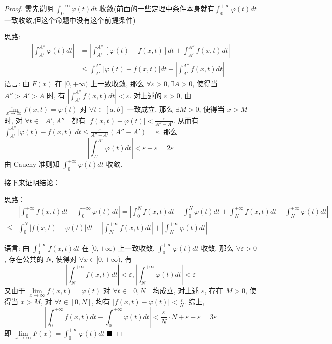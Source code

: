 \documentclass[lang=cn,newtx,10pt,scheme=chinese]{elegantbook}
\begin{document}
\begin{proof}
需先说明 $\int_{0}^{+\infty} \varphi(t) dt$ 收敛(前面的一些定理中条件本身就有$\int_{0}^{+\infty}\varphi(t) dt$一致收敛,但这个命题中没有这个前提条件)

思路:
\begin{align*}
|\int_{A'}^{A''} \varphi(t) dt| &= \left|\int_{A'}^{A''} [\varphi(t) - f(x,t)] dt + \int_{A'}^{A''} f(x,t) dt\right| \\
&\le \int_{A'}^{A''} |\varphi(t) - f(x,t)| dt + \left|\int_{A'}^{A''} f(x,t) dt\right|
\end{align*}
语言: 由 $F(x)$ 在 $[0, +\infty)$ 上一致收敛, 那么 $\forall \varepsilon > 0, \exists A > 0$, 使得当 $A''>A'>A$ 时, 有 $|\int_{A'}^{A''} f(x,t) dt| < \varepsilon$.
对上述的 $\varepsilon > 0$, 由 $\lim\limits_{x \to \infty} f(x,t) = \varphi(t)$ 对 $\forall t \in [a,b]$ 一致成立, 那么 $\exists M > 0$, 使得当 $x > M$ 时, 对 $\forall t \in [A', A'']$ 都有 $|f(x,t) - \varphi(t)| < \frac{\varepsilon}{A''-A'}$.
从而有 $\int_{A'}^{A''} |\varphi(t) - f(x,t)| dt \le \frac{\varepsilon}{A''-A'} (A''-A') = \varepsilon$. 
那么$$|\int_{A'}^{A''} \varphi(t) dt| < \varepsilon + \varepsilon = 2\varepsilon$$
由 Cauchy 准则知 $\int_{0}^{+\infty} \varphi(t) dt$ 收敛.


接下来证明结论：

思路：
\begin{align*}
& \left|\int_{0}^{+\infty} f(x,t)dt - \int_{0}^{+\infty} \varphi(t)dt\right| = \left|\int_{0}^{N} f(x,t)dt - \int_{0}^{N} \varphi(t)dt + \int_{N}^{+\infty} f(x,t)dt - \int_{N}^{+\infty} \varphi(t)dt\right| \\
\le & \int_{0}^{N} |f(x,t) - \varphi(t)|dt + \left|\int_{N}^{+\infty} f(x,t)dt\right| + \left|\int_{N}^{+\infty} \varphi(t)dt\right|
\end{align*}

语言: 由 $\int_{0}^{+\infty} f(x,t)dt$ 在 $[0, +\infty)$ 上一致收敛, $\int_{0}^{+\infty} \varphi(t)dt$ 收敛, 那么 $\forall \varepsilon > 0$, 存在公共的 $N$, 使得对 $\forall x \in [0, +\infty)$, 有 $$|\int_{N}^{+\infty} f(x,t)dt| < \varepsilon,|\int_{N}^{+\infty} \varphi(t)dt| < \varepsilon$$
又由于 $\lim\limits_{x \to \infty} f(x,t) = \varphi(t)$ 对 $\forall t \in [0, N]$ 均成立, 对上述 $\varepsilon$, 存在 $M > 0$, 使得当 $x > M$, 对 $\forall t \in [0, N]$, 均有 $|f(x,t)-\varphi(t)| < \frac{\varepsilon}{N}$.
综上, $$|\int_{0}^{+\infty} f(x,t)dt - \int_{0}^{+\infty} \varphi(t)dt| < \frac{\varepsilon}{N} \cdot N + \varepsilon + \varepsilon = 3\varepsilon$$
即 $\lim\limits_{x \to \infty} F(x) = \int_{0}^{+\infty} \varphi(t)dt$
$\hfill \blacksquare$
\end{proof}
\end{document}
